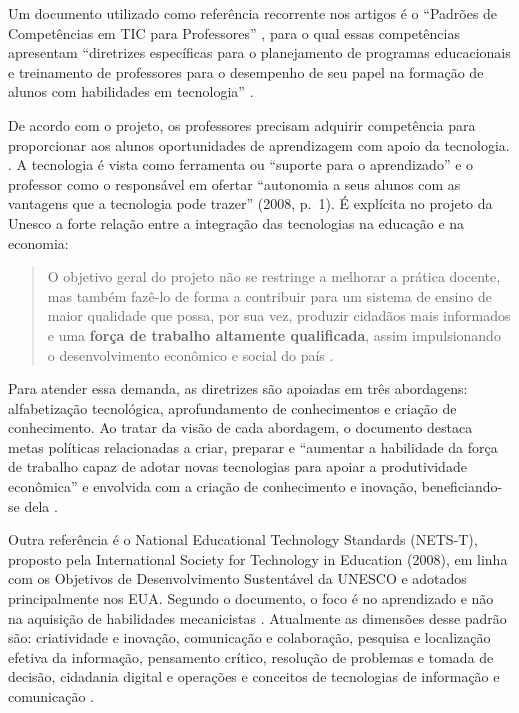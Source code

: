 \documentclass[portuguese]{textolivre}
\begin{document}
Um documento utilizado como referência recorrente nos artigos é o
``Padrões de Competências em TIC para Professores'' \cite{unesco2008},
para o qual essas competências apresentam ``diretrizes específicas para
o planejamento de programas educacionais e treinamento de professores
para o desempenho de seu papel na formação de alunos com habilidades em
tecnologia'' \cite[p.~1]{unesco2008}.

De acordo com o projeto, os professores precisam adquirir competência
para proporcionar aos alunos oportunidades de aprendizagem com apoio da
tecnologia. \cite{unesco2008}. A tecnologia é vista como ferramenta ou
``suporte para o aprendizado'' e o professor como o responsável em
ofertar ``autonomia a seus alunos com as vantagens que a tecnologia pode
trazer'' (2008, p.~1). É explícita no projeto da Unesco a forte relação
entre a integração das tecnologias na educação e na economia:
\begin{quote}
O objetivo geral do projeto não se restringe a melhorar a prática
docente, mas também fazê-lo de forma a contribuir para um sistema de
ensino de maior qualidade que possa, por sua vez, produzir cidadãos mais
informados e uma \textbf{força de trabalho altamente qualificada}, assim
impulsionando o desenvolvimento econômico e social do país \cite[p.~4, grifo nosso]{unesco2008}.
\end{quote}

Para atender essa demanda, as diretrizes são apoiadas em três
abordagens: alfabetização tecnológica, aprofundamento de conhecimentos e
criação de conhecimento. Ao tratar da visão de cada abordagem, o
documento destaca metas políticas relacionadas a criar, preparar e
``aumentar a habilidade da força de trabalho capaz de adotar novas
tecnologias para apoiar a produtividade econômica'' e envolvida com a
criação de conhecimento e inovação, beneficiando-se dela
\cite[p.~9]{unesco2009}.

Outra referência é o National Educational Technology Standards (NETS-T),
proposto pela International Society for Technology in Education (2008),
em linha com os Objetivos de Desenvolvimento Sustentável da UNESCO e
adotados principalmente nos EUA. Segundo o documento, o foco é no
aprendizado e não na aquisição de habilidades mecanicistas
\cite{iste2008}. Atualmente as dimensões desse padrão são: criatividade
e inovação, comunicação e colaboração, pesquisa e localização efetiva da
informação, pensamento crítico, resolução de problemas e tomada de
decisão, cidadania digital e operações e conceitos de tecnologias de
informação e comunicação \cite{rodriguez2018}.
\end{document}
